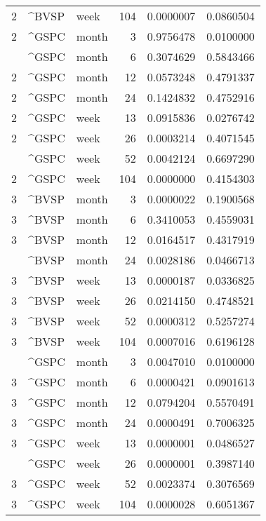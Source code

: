 \begin{tabular}{rllrrr}
2 & \textasciicircum{}BVSP & week & 104 & 0.0000007 & 0.0860504\\
2 & \textasciicircum{}GSPC & month & 3 & 0.9756478 & 0.0100000\\
\addlinespace
2 & \textasciicircum{}GSPC & month & 6 & 0.3074629 & 0.5843466\\
2 & \textasciicircum{}GSPC & month & 12 & 0.0573248 & 0.4791337\\
2 & \textasciicircum{}GSPC & month & 24 & 0.1424832 & 0.4752916\\
2 & \textasciicircum{}GSPC & week & 13 & 0.0915836 & 0.0276742\\
2 & \textasciicircum{}GSPC & week & 26 & 0.0003214 & 0.4071545\\
\addlinespace
2 & \textasciicircum{}GSPC & week & 52 & 0.0042124 & 0.6697290\\
2 & \textasciicircum{}GSPC & week & 104 & 0.0000000 & 0.4154303\\
3 & \textasciicircum{}BVSP & month & 3 & 0.0000022 & 0.1900568\\
3 & \textasciicircum{}BVSP & month & 6 & 0.3410053 & 0.4559031\\
3 & \textasciicircum{}BVSP & month & 12 & 0.0164517 & 0.4317919\\
\addlinespace
3 & \textasciicircum{}BVSP & month & 24 & 0.0028186 & 0.0466713\\
3 & \textasciicircum{}BVSP & week & 13 & 0.0000187 & 0.0336825\\
3 & \textasciicircum{}BVSP & week & 26 & 0.0214150 & 0.4748521\\
3 & \textasciicircum{}BVSP & week & 52 & 0.0000312 & 0.5257274\\
3 & \textasciicircum{}BVSP & week & 104 & 0.0007016 & 0.6196128\\
\addlinespace
3 & \textasciicircum{}GSPC & month & 3 & 0.0047010 & 0.0100000\\
3 & \textasciicircum{}GSPC & month & 6 & 0.0000421 & 0.0901613\\
3 & \textasciicircum{}GSPC & month & 12 & 0.0794204 & 0.5570491\\
3 & \textasciicircum{}GSPC & month & 24 & 0.0000491 & 0.7006325\\
3 & \textasciicircum{}GSPC & week & 13 & 0.0000001 & 0.0486527\\
\addlinespace
3 & \textasciicircum{}GSPC & week & 26 & 0.0000001 & 0.3987140\\
3 & \textasciicircum{}GSPC & week & 52 & 0.0023374 & 0.3076569\\
3 & \textasciicircum{}GSPC & week & 104 & 0.0000028 & 0.6051367\\

\end{tabular}
